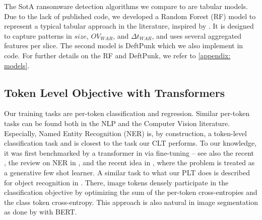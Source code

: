 The SotA ransomware detection algorithms we compare to are tabular models. Due to the lack of published code, we developed a Random Forest (RF) model to represent a typical tabular approach in the literature, inspired by \cite{SSD-insider-2018}. It is designed to capture patterns in $size$, $OV_{WAR}$, and $\Delta t_{WAR}$, and uses several aggregated features per slice. The second model is DeftPunk which we also implement in code. For further details on the RF and DeftPunk, we refer to \cref{appendix: models}.

\subsection{Token Level Objective with Transformers}
\label{per_token_AI}
Our training tasks are per-token classification and regression. Similar per-token tasks can be found both in the NLP and the Computer Vision literature. Especially, Named Entity Recognition (NER) is, by construction, a token-level classification task and is closest to the task our CLT performs. To our knowledge, it was first benchmarked by a transformer in \cite{Bert-2019} via fine-tuning -- see also the recent \cite{Portuguese_NER-2020}, the review on NER in \cite{NER-review-2023}, and the recent idea in \cite{GPT-NER-2023}, where the problem is treated as a generative few shot learner. A similar task to what our PLT does is described for object recognition in \cite{AllTokensMatter-2021}. There, image tokens densely participate in the classification objective by optimizing the sum of the per-token cross-entropies and the class token cross-entropy. This approach is also natural in image segmentation as done by \cite{HSI-BERT-2019} with BERT.